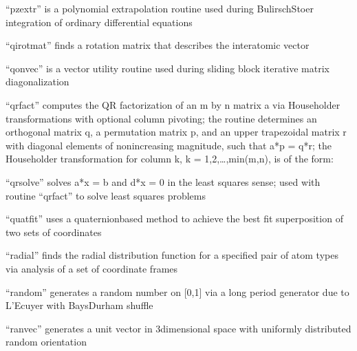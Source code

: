 \documentclass[letterpaper,11pt,english]{sphinxmanual}
\begin{document}
\sphinxAtStartPar
{}

\sphinxAtStartPar
“pzextr” is a polynomial extrapolation routine used during Bulirsch\sphinxhyphen{}Stoer integration of ordinary differential equations

\sphinxAtStartPar
{}

\sphinxAtStartPar
“qirotmat” finds a rotation matrix that describes the interatomic vector

\sphinxAtStartPar
{}

\sphinxAtStartPar
“qonvec” is a vector utility routine used during sliding block iterative matrix diagonalization

\sphinxAtStartPar
{}

\sphinxAtStartPar
“qrfact” computes the QR factorization of an m by n matrix a via Householder transformations with optional column pivoting; the routine determines an orthogonal matrix q, a permutation matrix p, and an upper trapezoidal matrix r with diagonal elements of nonincreasing magnitude, such that a*p = q*r; the Householder transformation for column k, k = 1,2,…,min(m,n), is of the form:

\sphinxAtStartPar
{}

\sphinxAtStartPar
“qrsolve” solves a*x = b and d*x = 0 in the least squares sense; used with routine “qrfact” to solve least squares problems

\sphinxAtStartPar
{}

\sphinxAtStartPar
“quatfit” uses a quaternion\sphinxhyphen{}based method to achieve the best fit superposition of two sets of coordinates

\sphinxAtStartPar
{}

\sphinxAtStartPar
“radial” finds the radial distribution function for a specified pair of atom types via analysis of a set of coordinate frames

\sphinxAtStartPar
{}

\sphinxAtStartPar
“random” generates a random number on {[}0,1{]} via a long period generator due to L’Ecuyer with Bays\sphinxhyphen{}Durham shuffle

\sphinxAtStartPar
{}

\sphinxAtStartPar
“ranvec” generates a unit vector in 3\sphinxhyphen{}dimensional space with uniformly distributed random orientation
\end{document}
